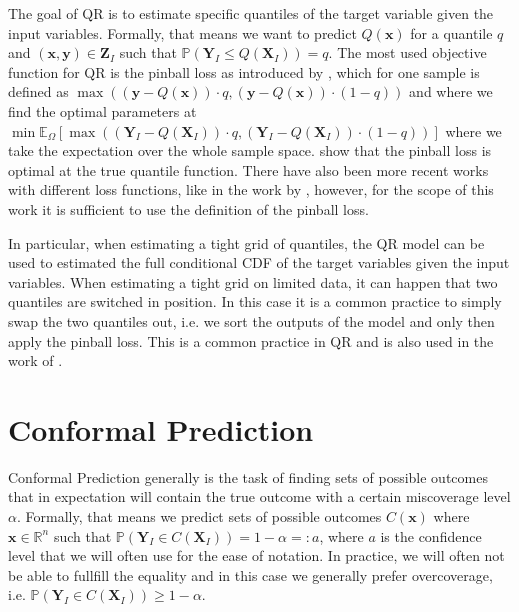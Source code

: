 The goal of QR is to estimate specific quantiles of the target variable given the input variables. Formally, that means we want to predict $Q(\mathbf{x})$ for a quantile $q$ and $(\mathbf{x}, \mathbf{y})\in\mathbf{Z}_I$ such that $\mathbb{P}(\mathbf{Y}_I \leq Q(\mathbf{X}_I)) = q$. The most used objective function for QR is the pinball loss as introduced by \cite{koenker1978regression}, which for one sample is defined as $\max ((\mathbf{y} - Q(\mathbf{x})) \cdot q, (\mathbf{y} - Q(\mathbf{x})) \cdot (1 - q))$ and where we find the optimal parameters at $ \min \mathbb{E}_{\Omega}\left[ \max \left((\mathbf{Y}_I - Q(\mathbf{X}_I)) \cdot q, (\mathbf{Y}_I - Q(\mathbf{X}_I)) \cdot (1 - q)\right)\right]$ where we take the expectation over the whole sample space. \cite{koenker1978regression} show that the pinball loss is optimal at the true quantile function. There have also been more recent works with different loss functions, like in the work by \cite{chung2021beyond}, however, for the scope of this work it is sufficient to use the definition of the pinball loss.

In particular, when estimating a tight grid of quantiles, the QR model can be used to estimated the full conditional CDF of the target variables given the input variables. When estimating a tight grid on limited data, it can happen that two quantiles are switched in position. In this case it is a common practice to simply swap the two quantiles out, i.e. we sort the outputs of the model and only then apply the pinball loss. This is a common practice in QR and is also used in the work of \cite{sesia2021conformal}.

\section{Conformal Prediction}\label{sec:cp}

Conformal Prediction generally is the task of finding sets of possible outcomes that in expectation will contain the true outcome with a certain miscoverage level $\alpha$. Formally, that means we predict sets of possible outcomes $C(\mathbf{x})$ where $\mathbf{x} \in \mathbb{R}^n$ such that $\mathbb{P}(\mathbf{Y}_I \in C(\mathbf{X}_I)) = 1 - \alpha=:a$, where $a$ is the confidence level that we will often use for the ease of notation. In practice, we will often not be able to fullfill the equality and in this case we generally prefer overcoverage, i.e. $\mathbb{P}(\mathbf{Y}_I \in C(\mathbf{X}_I)) \geq 1 - \alpha$.

